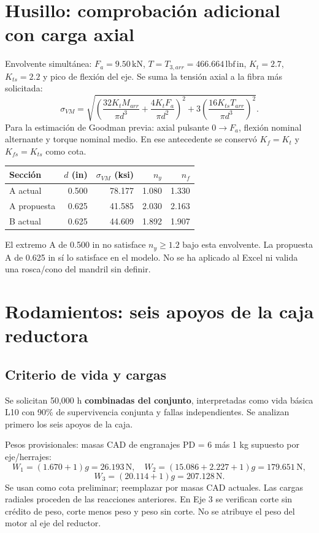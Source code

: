 \documentclass[11pt,a4paper]{article}
\newcommand{\lbin}{\,\mathrm{lbf\,in}}
\begin{document}
\section{Husillo: comprobación adicional con carga axial}
Envolvente simultánea: $F_a=9.50\,\mathrm{kN}$, $T=T_{3,arr}=466.664\lbin$, $K_t=2.7$, $K_{ts}=2.2$ y pico de flexión del eje. Se suma la tensión axial a la fibra más solicitada:
\[
\sigma_{VM}=\sqrt{\left(\frac{32K_tM_{arr}}{\pi d^3}+\frac{4K_tF_a}{\pi d^2}\right)^2
+3\left(\frac{16K_{ts}T_{arr}}{\pi d^3}\right)^2}.
\]
Para la estimación de Goodman previa: axial pulsante $0\rightarrow F_a$, flexión nominal alternante y torque nominal medio. En ese antecedente se conservó $K_f=K_t$ y $K_{fs}=K_{ts}$ como cota.

\begin{center}\small\begin{tabular}{lrrrr}\toprule

Sección & $d$ (in) & $\sigma_{VM}$ (ksi) & $n_y$ & $n_f$ \\ \midrule

A actual & 0.500 & 78.177 & 1.080 & 1.330 \\

A propuesta & 0.625 & 41.585 & 2.030 & 2.163 \\

B actual & 0.625 & 44.609 & 1.892 & 1.907 \\

\bottomrule\end{tabular}\end{center}

El extremo A de 0.500 in no satisface $n_y\geq1.2$ bajo esta envolvente. La propuesta A de 0.625 in sí lo satisface en el modelo. No se ha aplicado al Excel ni valida una rosca/cono del mandril sin definir.
\clearpage
\section{Rodamientos: seis apoyos de la caja reductora}
\subsection{Criterio de vida y cargas}
Se solicitan 50,000 h \textbf{combinadas del conjunto}, interpretadas como vida básica L10 con 90\% de supervivencia conjunta y fallas independientes. Se analizan primero los seis apoyos de la caja.

Pesos provisionales: masas CAD de engranajes PD = 6 más 1 kg supuesto por eje/herrajes:
\[
W_1=(1.670+1)g=26.193\,\mathrm N,
\quad W_2=(15.086+2.227+1)g=179.651\,\mathrm N,
\]
\[
W_3=(20.114+1)g=207.128\,\mathrm N.
\]
Se usan como cota preliminar; reemplazar por masas CAD actuales. Las cargas radiales proceden de las reacciones anteriores. En Eje 3 se verifican corte sin crédito de peso, corte menos peso y peso sin corte. No se atribuye el peso del motor al eje del reductor.
\end{document}
